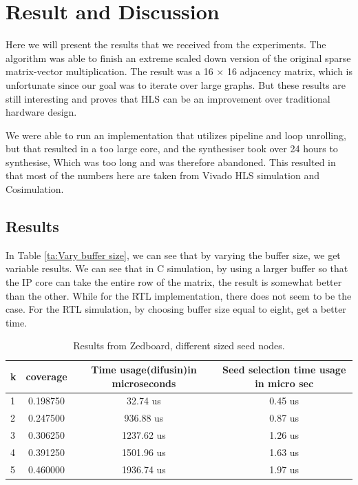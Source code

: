 \chapter{Result and Discussion} \label{result}
Here we will present the results that we received from the experiments. The algorithm was able to finish an extreme scaled down version of the original sparse matrix-vector multiplication. The result was a 16 $\times$ 16 adjacency matrix, which is unfortunate since our goal was to iterate over large graphs. But these results are still interesting and proves that HLS can be an improvement over traditional hardware design.


We were able to run an implementation that utilizes pipeline and loop unrolling, but that resulted in a too large core, and the synthesiser took over 24 hours to synthesise, Which was too long and was therefore abandoned.
This resulted in that most of the numbers here are taken from Vivado HLS simulation and Cosimulation. 

\section{Results}
In Table \ref{ta:Vary buffer size}, we can see that by varying the buffer size, we get variable results. We can see that in C simulation, by using a larger buffer so that the IP core can take the entire row of the matrix, the result is somewhat better than the other. While for the RTL implementation, there does not seem to be the case. For the RTL simulation, by choosing buffer size equal to eight, get a better time. 

\begin{table}[ht]
\centering
\caption{Results from Zedboard, different sized seed nodes.}
\label{tab:Different K}
\begin{tabular}{|l|c|c|c|}
\hline
 k     & coverage     &  Time usage(difusin)in microseconds & Seed selection time usage in micro sec \\ \hline
 1  &         0.198750            &     32.74 us & 0.45 us \\ \hline
 2  &         0.247500             &     936.88 us &    0.87 us \\ \hline
 3  &         0.306250            &     1237.62 us &1.26 us     \\ \hline
 4  &         0.391250            &     1501.96 us &1.63 us     \\ \hline
 5  &         0.460000            &     1936.74 us &    1.97 us \\ \hline
\end{tabular}
\end{table}



